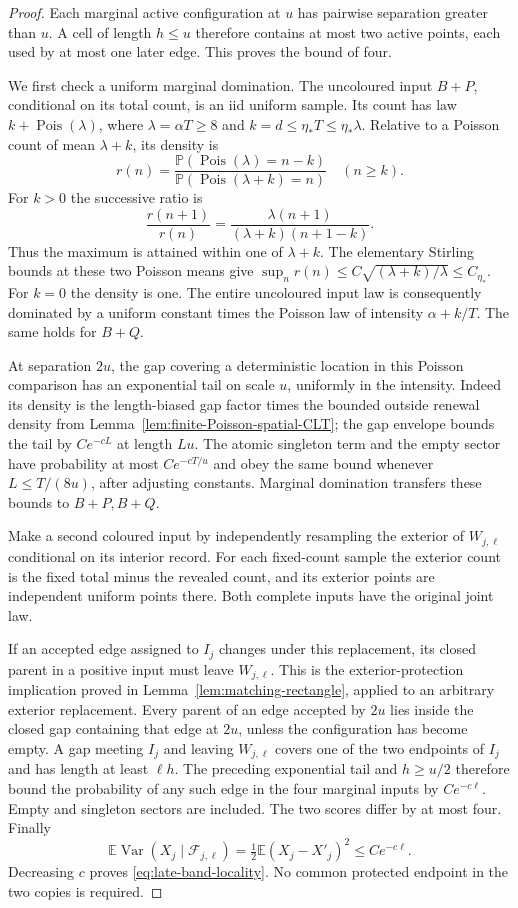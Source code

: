 \documentclass[11pt,letterpaper]{article}
\newcommand{\PP}{\mathbb P}\newcommand{\EE}{\mathbb E}
\begin{document}
\begin{proof}
Each marginal active configuration at $u$ has pairwise
separation greater than $u$. A cell of length $h\le u$
therefore contains at most two active points, each used by
at most one later edge. This proves the bound of four.

We first check a uniform marginal domination. The uncoloured
input $B+P$, conditional on its total count, is an iid uniform
sample. Its count has law $k+\operatorname{Pois}(\lambda)$,
where $\lambda=\alpha T\ge8$ and $k=d\le\eta_*T\le\eta_*\lambda$.
Relative to a Poisson count of mean $\lambda+k$, its density is
\[
 r(n)=\frac{\PP(\operatorname{Pois}(\lambda)=n-k)}
             {\PP(\operatorname{Pois}(\lambda+k)=n)}
       \quad(n\ge k).
\]
For $k>0$ the successive ratio is
\[
 \frac{r(n+1)}{r(n)}
       =\frac{\lambda(n+1)}{(\lambda+k)(n+1-k)}.
\]
Thus the maximum is attained within one of $\lambda+k$.
The elementary Stirling bounds at these two Poisson means give
$\sup_n r(n)\le C\sqrt{(\lambda+k)/\lambda}\le C_{\eta_*}$.
For $k=0$ the density is one. The entire uncoloured input
law is consequently dominated by a uniform constant times
the Poisson law of intensity $\alpha+k/T$. The same holds
for $B+Q$.

At separation $2u$, the gap covering a deterministic location
in this Poisson comparison has an exponential tail on scale
$u$, uniformly in the intensity. Indeed its density is the
length-biased gap factor times the bounded outside renewal
density from Lemma~\ref{lem:finite-Poisson-spatial-CLT};
the gap envelope bounds the tail by $Ce^{-cL}$ at length $Lu$.
The atomic singleton term and the empty sector have probability
at most $Ce^{-cT/u}$ and obey the same bound whenever
$L\le T/(8u)$, after adjusting constants.
Marginal domination transfers these bounds to $B+P,B+Q$.

Make a second coloured input by independently resampling the
exterior of $W_{j,\ell}$ conditional on its interior record.
For each fixed-count sample the exterior count is the fixed
total minus the revealed count, and its exterior points are
independent uniform points there. Both complete inputs have
the original joint law.

If an accepted edge assigned to $I_j$ changes under this
replacement, its closed parent in a positive input must leave
$W_{j,\ell}$. This is the exterior-protection implication
proved in Lemma~\ref{lem:matching-rectangle}, applied to an
arbitrary exterior replacement. Every parent of an edge
accepted by $2u$ lies inside the closed gap containing that
edge at $2u$, unless the configuration has become empty.
A gap meeting $I_j$ and leaving $W_{j,\ell}$ covers one of
the two endpoints of $I_j$ and has length at least $\ell h$.
The preceding exponential tail and $h\ge u/2$ therefore
bound the probability of any such edge in the four marginal
inputs by $Ce^{-c\ell}$. Empty and singleton sectors are
included. The two scores differ by at most four. Finally
\[
 \EE\operatorname{Var}(X_j\mid\mathcal F_{j,\ell})
       =\tfrac12\EE(X_j-X'_j)^2\le Ce^{-c\ell}.
\]
Decreasing $c$ proves \eqref{eq:late-band-locality}.
No common protected endpoint in the two copies is required.
\end{proof}
\end{document}
